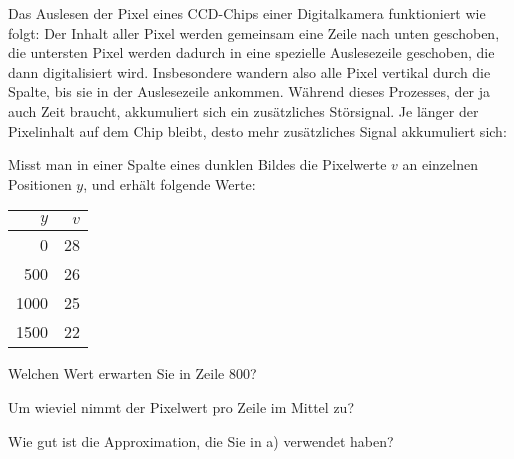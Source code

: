Das Auslesen der Pixel eines CCD-Chips einer Digitalkamera funktioniert
wie folgt: Der Inhalt aller Pixel werden gemeinsam eine Zeile nach unten
geschoben,
die untersten Pixel werden dadurch in eine spezielle Auslesezeile geschoben,
die dann digitalisiert wird. Insbesondere wandern also alle Pixel vertikal
durch die Spalte, bis sie in der Auslesezeile ankommen.
Während dieses Prozesses, der ja auch Zeit braucht, akkumuliert sich
ein zusätzliches Störsignal. Je länger der Pixelinhalt auf dem Chip
bleibt, desto mehr zusätzliches Signal akkumuliert sich:
\begin{center}
\end{center}
Misst man in einer Spalte eines dunklen Bildes die Pixelwerte $v$ an
einzelnen Positionen $y$, und erhält folgende Werte:
\begin{center}
\begin{tabular}{|r|r|}
\hline
$y$&$v$\\
\hline
   0& 28\\
 500& 26\\
1000& 25\\
1500& 22\\
\hline
\end{tabular}
\end{center}
\begin{teilaufgaben}
\item Welchen Wert erwarten Sie in Zeile 800?
\item Um wieviel nimmt der Pixelwert pro Zeile im Mittel zu?
\item Wie gut ist die Approximation, die Sie in a) verwendet haben?
\end{teilaufgaben}

